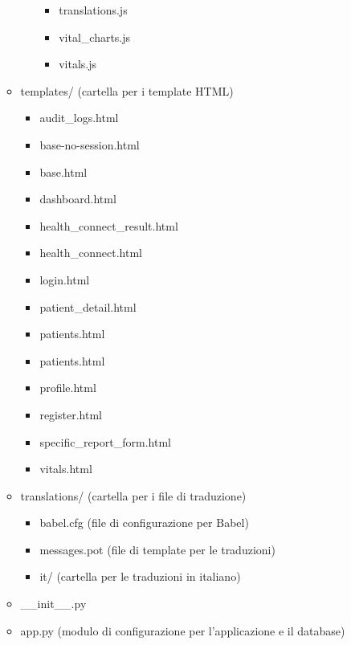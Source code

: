 \documentclass[12pt,a4paper,oneside]{report}
\begin{document}
\begin{itemize}
\begin{itemize}
\begin{itemize}
\begin{itemize}
                                  \item translations.js
                                  \item vital\_charts.js
                                  \item vitals.js
                              \end{itemize}
                    \end{itemize}
              \item templates/ (cartella per i template HTML)
                    \begin{itemize}
                        \item audit\_logs.html
                        \item base-no-session.html
                        \item base.html
                        \item dashboard.html
                        \item health\_connect\_result.html
                        \item health\_connect.html
                        \item login.html
                        \item patient\_detail.html
                        \item patients.html
                        \item patients.html
                        \item profile.html
                        \item register.html
                        \item specific\_report\_form.html
                        \item vitals.html
                    \end{itemize}
              \item translations/ (cartella per i file di traduzione)
                    \begin{itemize}
                        \item babel.cfg (file di configurazione per Babel)
                        \item messages.pot (file di template per le traduzioni)
                        \item it/ (cartella per le traduzioni in italiano)
                    \end{itemize}
              \item \_\_init\_\_.py
              \item app.py (modulo di configurazione per l'applicazione e il database)

\end{itemize}
\end{itemize}
\end{document}
